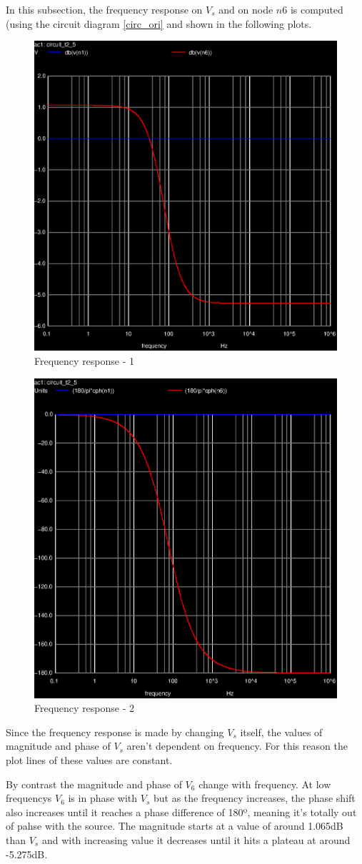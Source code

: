 In this subsection, the frequency response on $V_s$ and on node $n6$ is computed (using the circuit diagram \ref{circ_ori} and shown in the following plots.

\begin{figure}[H]
	\centering
	\includegraphics[width=0.55\linewidth]{ac-1.eps}
	\caption{Frequency response - 1}
\label{fig:Dsnh_sim_t2}
\end{figure}

\begin{figure}[H]
	\centering
	\includegraphics[width=0.55\linewidth]{ac-2.eps}
	\caption{Frequency response - 2}
\label{fig:Dsnh_sim_t2}
\end{figure}

Since the frequency response is made by changing $V_s$ itself, the values of magnitude and phase of $V_s$ aren't dependent on frequency. For this reason the plot lines of these values are constant.

By contrast the magnitude and phase of $V_6$ change with frequency. At low frequencys $V_6$ is in phase with $V_s$ but as the frequency increases, the phase shift also increases until it reaches a phase difference of 180º, meaning it's totally out of pahse with the source. The magnitude starts at a value of around 1.065dB than $V_s$ and with increasing value it decreases until it hits a plateau at around -5.275dB. 

